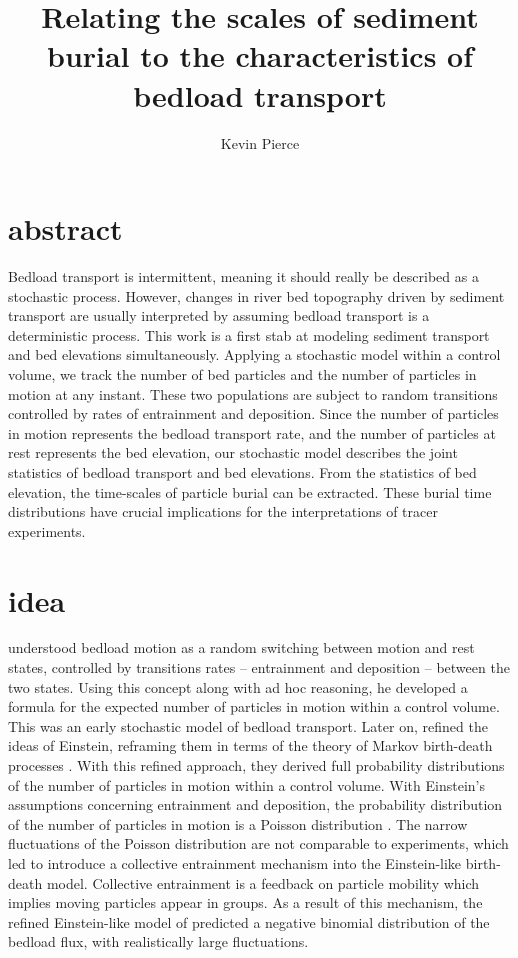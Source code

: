\documentclass{article}
\begin{document}
\title{Relating the scales of sediment burial to the characteristics of bedload transport}
\author{Kevin Pierce}
\maketitle
\section{abstract}
Bedload transport is intermittent, meaning it should really be described as a stochastic process. 
However, changes in river bed topography driven by sediment transport are usually interpreted by assuming bedload transport is a deterministic process. 
This work is a first stab at modeling sediment transport and bed elevations simultaneously. 
Applying a stochastic model within a control volume, we track the number of bed particles and the number of particles in motion at any instant. 
These two populations are subject to random transitions controlled by rates of entrainment and deposition. 
Since the number of particles in motion represents the bedload transport rate, and the number of particles at rest represents the bed elevation, our stochastic model describes the joint statistics of bedload transport and bed elevations. 
From the statistics of bed elevation, the time-scales of particle burial can be extracted. 
These burial time distributions have crucial implications for the interpretations of tracer experiments. 

\section{idea}
\citet{Einstein1950} understood bedload motion as a random switching between motion and rest states, controlled by transitions rates -- entrainment and deposition -- between the two states. 
Using this concept along with ad hoc reasoning, he developed a formula for the expected number of particles in motion within a control volume.
This was an early stochastic model of bedload transport.  
Later on, \citet{Ancey2006, Ancey2008, Heyman2013} refined the ideas of Einstein, reframing them in terms of the theory of Markov birth-death processes \citep[e.g.][]{Cox1965}. 
With this refined approach, they derived full probability distributions of the number of particles in motion within a control volume. 
With Einstein's assumptions concerning entrainment and deposition, the probability distribution of the number of particles in motion is a Poisson distribution \citep{Ancey2006}. 
The narrow fluctuations of the Poisson distribution are not comparable to experiments, which led \citet{Ancey2008} to introduce a collective entrainment mechanism into the Einstein-like birth-death model. 
Collective entrainment is a feedback on particle mobility which implies moving particles appear in groups. 
As a result of this mechanism, the refined Einstein-like model of \citet{Ancey2008} predicted a negative binomial distribution of the bedload flux, with realistically large fluctuations. 
\end{document}

